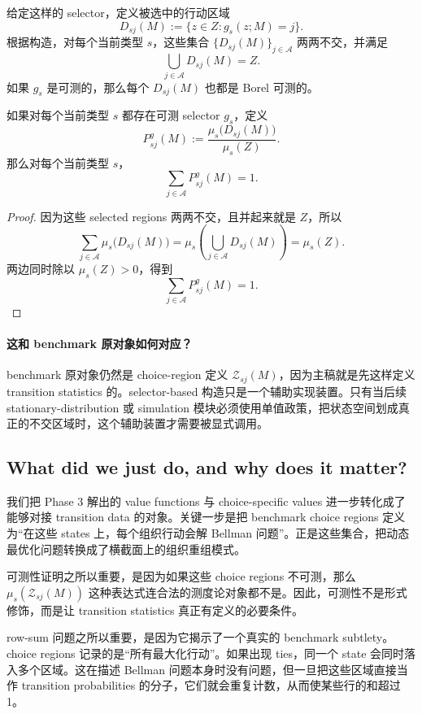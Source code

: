 给定这样的 selector，定义被选中的行动区域
\[
D_{sj}(M):=\{z\in Z:g_s(z;M)=j\}.
\]
根据构造，对每个当前类型 $s$，这些集合 $\{D_{sj}(M)\}_{j\in\mathcal A}$ 两两不交，并满足
\[
\bigcup_{j\in\mathcal A}D_{sj}(M)=Z.
\]
如果 $g_s$ 是可测的，那么每个 $D_{sj}(M)$ 也都是 Borel 可测的。

\begin{proposition}
如果对每个当前类型 $s$ 都存在可测 selector $g_s$，定义
\[
P^g_{sj}(M):=\frac{\mu_s\bigl(D_{sj}(M)\bigr)}{\mu_s(Z)}.
\]
那么对每个当前类型 $s$，
\[
\sum_{j\in\mathcal A}P^g_{sj}(M)=1.
\]
\end{proposition}

\begin{proof}
因为这些 selected regions 两两不交，且并起来就是 $Z$，所以
\[
\sum_{j\in\mathcal A}\mu_s\bigl(D_{sj}(M)\bigr)
=
\mu_s\!\left(\bigcup_{j\in\mathcal A}D_{sj}(M)\right)
=
\mu_s(Z).
\]
两边同时除以 $\mu_s(Z)>0$，得到
\[
\sum_{j\in\mathcal A}P^g_{sj}(M)=1.
\]
\end{proof}

\paragraph{这和 benchmark 原对象如何对应？}
benchmark 原对象仍然是 choice-region 定义 $\mathcal Z_{sj}(M)$，因为主稿就是先这样定义 transition statistics 的。selector-based 构造只是一个辅助实现装置。只有当后续 stationary-distribution 或 simulation 模块必须使用单值政策，把状态空间划成真正的不交区域时，这个辅助装置才需要被显式调用。

\subsection{What did we just do, and why does it matter?}

我们把 Phase 3 解出的 value functions 与 choice-specific values 进一步转化成了能够对接 transition data 的对象。关键一步是把 benchmark choice regions 定义为“在这些 states 上，每个组织行动会解 Bellman 问题”。正是这些集合，把动态最优化问题转换成了横截面上的组织重组模式。

可测性证明之所以重要，是因为如果这些 choice regions 不可测，那么 $\mu_s(\mathcal Z_{sj}(M))$ 这种表达式连合法的测度论对象都不是。因此，可测性不是形式修饰，而是让 transition statistics 真正有定义的必要条件。

row-sum 问题之所以重要，是因为它揭示了一个真实的 benchmark subtlety。choice regions 记录的是“所有最大化行动”。如果出现 ties，同一个 state 会同时落入多个区域。这在描述 Bellman 问题本身时没有问题，但一旦把这些区域直接当作 transition probabilities 的分子，它们就会重复计数，从而使某些行的和超过 1。

